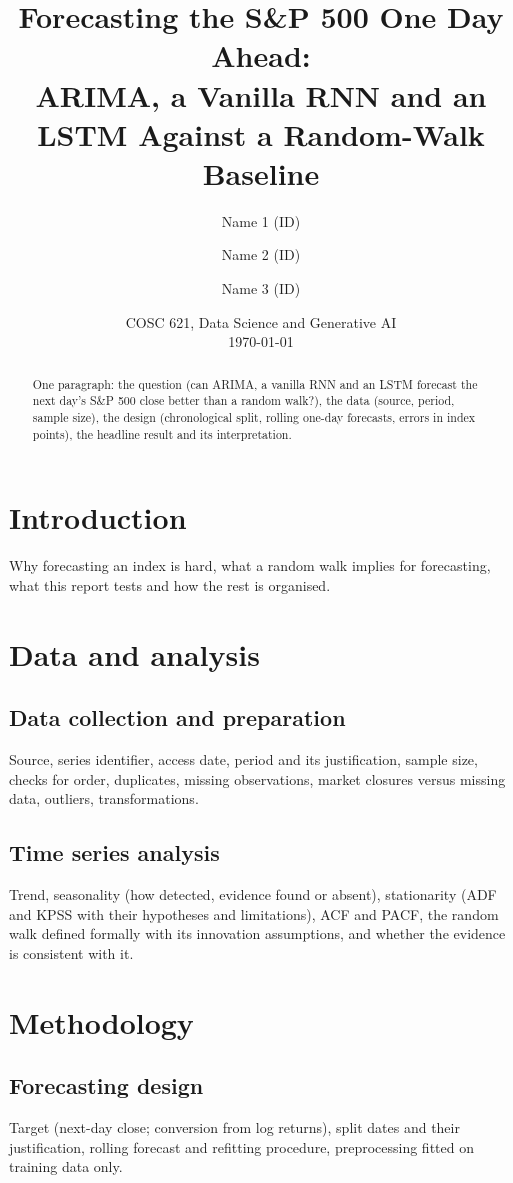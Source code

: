 \documentclass[11pt,a4paper]{article}
\title{Forecasting the S\&P 500 One Day Ahead:\\ARIMA, a Vanilla RNN and an LSTM Against a Random-Walk Baseline}
\author{Name 1 (ID) \and Name 2 (ID) \and Name 3 (ID)}
\date{COSC 621, Data Science and Generative AI \\ \today}
\begin{document}
\maketitle

\begin{abstract}
One paragraph: the question (can ARIMA, a vanilla RNN and an LSTM forecast the next day's S\&P 500
close better than a random walk?), the data (source, period, sample size), the design (chronological
split, rolling one-day forecasts, errors in index points), the headline result and its interpretation.
\end{abstract}

\section{Introduction}
Why forecasting an index is hard, what a random walk implies for forecasting, what this report tests
and how the rest is organised.

\section{Data and analysis}
\subsection{Data collection and preparation}
Source, series identifier, access date, period and its justification, sample size, checks for order,
duplicates, missing observations, market closures versus missing data, outliers, transformations.
\subsection{Time series analysis}
Trend, seasonality (how detected, evidence found or absent), stationarity (ADF and KPSS with their
hypotheses and limitations), ACF and PACF, the random walk defined formally with its innovation
assumptions, and whether the evidence is consistent with it.

\section{Methodology}
\subsection{Forecasting design}
Target (next-day close; conversion from log returns), split dates and their justification, rolling
forecast and refitting procedure, preprocessing fitted on training data only.
\end{document}
